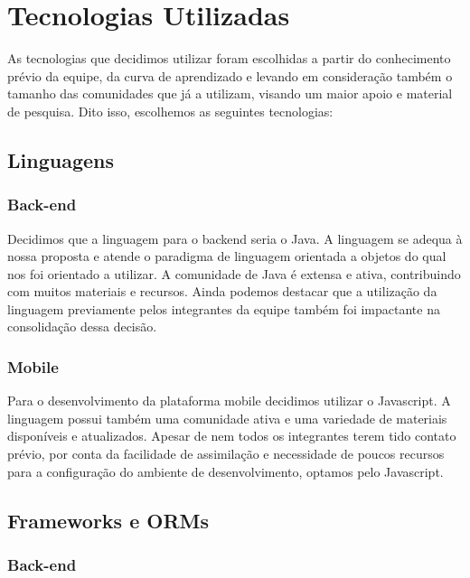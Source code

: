 \section{Tecnologias Utilizadas}

As tecnologias que decidimos utilizar foram escolhidas a partir do conhecimento prévio da equipe, da curva de aprendizado e levando em consideração também o tamanho das comunidades que já a utilizam, visando um maior apoio e material de pesquisa.
Dito isso, escolhemos as seguintes tecnologias:

\subsection{Linguagens}

\subsubsection{Back-end}

Decidimos que a linguagem para o \gls{backend} seria o Java. A linguagem se adequa à nossa proposta e atende o paradigma de linguagem orientada a objetos do qual nos foi orientado a utilizar. 
A comunidade de Java é extensa e ativa, contribuindo com muitos materiais e recursos. Ainda podemos destacar que a utilização da linguagem previamente pelos integrantes da equipe também foi impactante na consolidação dessa decisão.

\subsubsection{Mobile}
Para o desenvolvimento da plataforma mobile decidimos utilizar o Javascript. A linguagem possui também uma comunidade ativa e uma variedade de materiais disponíveis e atualizados. Apesar de nem todos os integrantes terem tido contato prévio, por conta da facilidade de assimilação e necessidade de poucos recursos para a configuração do ambiente de desenvolvimento, optamos pelo Javascript.

\subsection{Frameworks e ORMs}

\subsubsection{Back-end}

